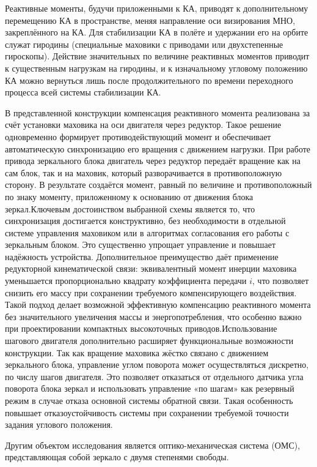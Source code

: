 Реактивные моменты, будучи приложенными к КА, приводят к дополнительному перемещению КА в пространстве, меняя направление оси визирования МНО, закреплённого на КА. Для стабилизации КА в полёте и удержании его на орбите служат гиродины (специальные маховики с приводами или двухстепенные гироскопы). Действие значительных по величине реактивных моментов приводит к существенным нагрузкам на гиродины, и к изначальному угловому положению КА можно вернуться лишь после продолжительного по времени переходного процесса всей системы стабилизации КА.\cite{углова2019оценка, zhao2023effect}

В представленной конструкции компенсация реактивного момента реализована за счёт установки маховика на оси двигателя через редуктор. Такое решение одновременно формирует противодействующий момент и обеспечивает автоматическую синхронизацию его вращения с движением нагрузки. При работе привода зеркального блока двигатель через редуктор передаёт вращение как на сам блок, так и на маховик, который разворачивается в противоположную сторону. В результате создаётся момент, равный по величине и противоположный по знаку моменту, приложенному к основанию от движения блока зеркал.Ключевым достоинством выбранной схемы является то, что синхронизация достигается конструктивно, без необходимости в отдельной системе управления маховиком или в алгоритмах согласования его работы с зеркальным блоком. Это существенно упрощает управление и повышает надёжность устройства. Дополнительное преимущество даёт применение редукторной кинематической связи: эквивалентный момент инерции маховика уменьшается пропорционально квадрату коэффициента передачи $i$, что позволяет снизить его массу при сохранении требуемого компенсирующего воздействия. Такой подход делает возможной эффективную компенсацию реактивного момента без значительного увеличения массы и энергопотребления, что особенно важно при проектировании компактных высокоточных приводов.Использование шагового двигателя дополнительно расширяет функциональные возможности конструкции. Так как вращение маховика жёстко связано с движением зеркального блока, управление углом поворота может осуществляться дискретно, по числу шагов двигателя. Это позволяет отказаться от отдельного датчика угла поворота блока зеркал и использовать управление «по шагам» как резервный режим в случае отказа основной системы обратной связи. Такая особенность повышает отказоустойчивость системы при сохранении требуемой точности задания углового положения.

Другим объектом исследования является оптико-механическая система (ОМС), представляющая собой зеркало с двумя степенями свободы.

